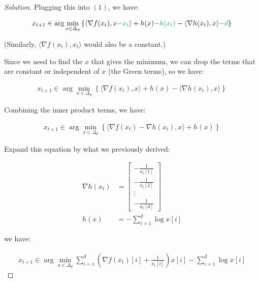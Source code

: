 \documentclass{article}
\newenvironment{solution}
  {\renewcommand\qedsymbol{$\blacksquare$}\begin{proof}[Solution]}
  {\end{proof}}
\begin{document}
\begin{solution}
    Plugging this into $(1)$, we have:
    
    \begin{align*}
        x_{t + 1} 
        \in
        \arg\min_{x \in \Delta_d}
        \left\{
        \langle \nabla f(x_t), x \textcolor{Green}{- x_t} \rangle + h(x) \textcolor{Green}{- h(x_t)} - \langle \nabla h(x_t), x \rangle \textcolor{Green}{- d} \right\}
    \end{align*}

    (Similarly, $\langle \nabla f(x_t), x_t \rangle$ would also be a constant.)
    \bigskip

    Since we need to find the $x$ that gives the minimum, we can drop the terms that are constant or independent of $x$ (the Green terms), 
    so we have:

    \begin{align*}
        x_{t + 1} 
        \in
        \arg\min_{x \in \Delta_d}
        \left\{
        \langle \nabla f(x_t), x \rangle + h(x) - \langle \nabla h(x_t), x \rangle \right\}
    \end{align*}

    Combining the inner product terms, we have:

    \begin{align*}
        x_{t + 1} 
        \in
        \arg\min_{x \in \Delta_d}
        \left\{
        \langle \nabla f(x_t) - \nabla h(x_t), x \rangle + h(x) \right\}
    \end{align*}

    Expand this equation by what we previously derived:

    \begin{align*}
        \nabla h(x_t) &= \begin{bmatrix}
            -\frac{1}{x_t[1]} \\
            -\frac{1}{x_t[2]} \\
            \vdots \\
            -\frac{1}{x_t[d]}
        \end{bmatrix} \\
        h(x) &= -\sum_{i=1}^d \log x[i]
    \end{align*}

    we have:

    \begin{align*}
        x_{t + 1} 
        \in
        \arg\min_{x \in \Delta_d} \sum_{i=1}^d \left( \nabla f(x_t)[i] + \frac{1}{x_t[i]} \right) x[i] - \sum_{i=1}^d \log x[i]
    \end{align*}
    

\end{solution}
\end{document}
